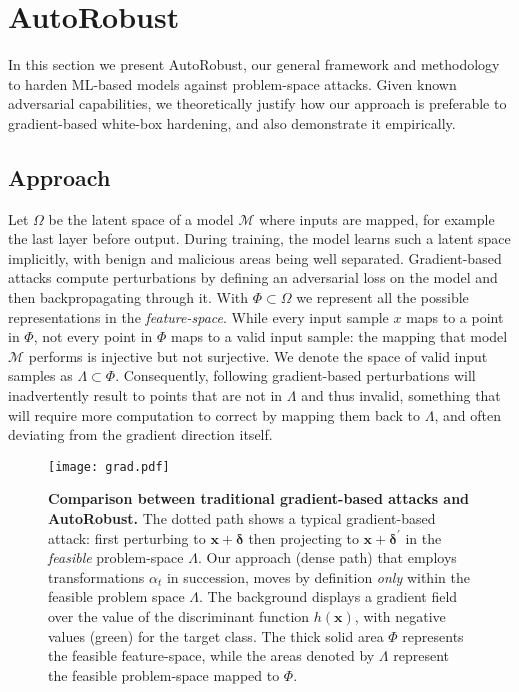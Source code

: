 \section{AutoRobust}
In this section we present AutoRobust, our general framework and methodology to harden ML-based models against problem-space attacks.
Given known adversarial capabilities, we theoretically justify how our approach is preferable to gradient-based white-box hardening, and also demonstrate it empirically.

\subsection{Approach}
Let $\Omega$ be the latent space of a model $\mathcal{M}$ where inputs are mapped, for example the last layer before output.
During training, the model learns such a latent space implicitly, with benign and malicious areas being well separated.
Gradient-based attacks compute perturbations by defining an adversarial loss on the model and then backpropagating through it.
With  $\Phi \subset \Omega$ we represent all the possible representations in the \textit{feature-space}.
While every input sample $x$ maps to a point in $\Phi$, not every point in $\Phi$ maps to a valid input sample: the mapping that model $\mathcal{M}$ performs is injective but not surjective.
We denote the space of valid input samples as $\Lambda \subset \Phi$.
Consequently, following gradient-based perturbations will inadvertently result to points that are not in $\Lambda$ and thus invalid, something that will require more computation to correct by mapping them back to $\Lambda$, and often deviating from the gradient direction itself.

\begin{figure*}[ht]
\centering
\texttt{[image: grad.pdf]}
\caption{\textbf{Comparison between traditional gradient-based attacks and AutoRobust.} The dotted path shows a typical gradient-based attack: first perturbing to $\mathbf{x} + \boldsymbol{\delta}$ then projecting to $\mathbf{x} + \boldsymbol{\delta}^\prime$ in the \emph{feasible} problem-space $\Lambda$. Our approach (dense path) that employs transformations $\alpha_t$ in succession, moves by definition \textit{only} within the feasible problem space $\Lambda$. The background displays a gradient field over the value of the discriminant function $h(\mathbf{x})$, with negative values (green) for the target class. The thick solid area $\Phi$ represents the feasible feature-space, while the areas denoted by $\Lambda$ represent the feasible problem-space mapped to $\Phi$.}
\label{fig:grad}
\end{figure*}



